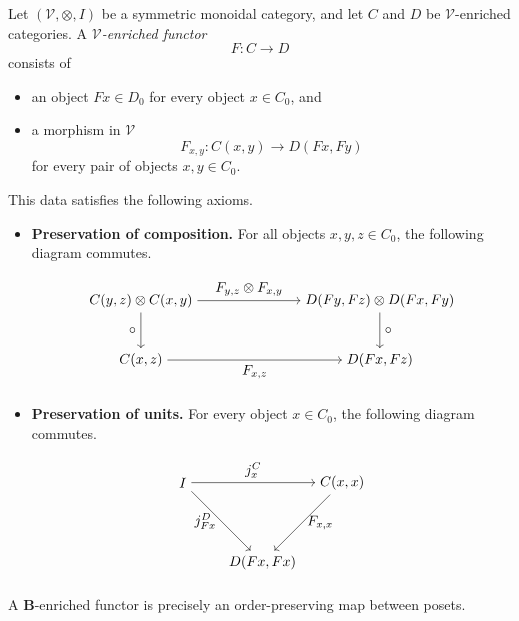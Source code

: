 \documentclass{tac}
\begin{document}
\begin{definition}
Let $(\mathcal{V},\otimes,I)$ be a symmetric monoidal category, and let $C$
and $D$ be $\mathcal{V}$-enriched categories. A
\emph{$\mathcal{V}$-enriched functor}
\[
F:C\to D
\]
consists of

\begin{itemize}
    \item an object $Fx\in D_0$ for every object $x\in C_0$, and
    \item a morphism in $\mathcal{V}$
    \[
    F_{x,y}:C(x,y)\to D(Fx,Fy)
    \]
    for every pair of objects $x,y\in C_0$.
\end{itemize}

This data satisfies the following axioms.
\begin{itemize}
    \item \textbf{Preservation of composition.}
    For all objects $x,y,z\in C_0$, the following diagram commutes.
    
    \[
    \begin{tikzpicture}[node distance=4cm]
        \node (A) at (0,0)
        {$C(y,z)\otimes C(x,y)$};

        \node (B) at (6,0)
        {$D(Fy,Fz)\otimes D(Fx,Fy)$};

        \node (C) at (0,-1.5)
        {$C(x,z)$};

        \node (D) at (6,-1.5)
        {$D(Fx,Fz)$};

        \draw[->] (A)--node[above]{$F_{y,z}\otimes F_{x,y}$}(B);
        \draw[->] (A)--node[left]{$\circ$}(C);
        \draw[->] (B)--node[right]{$\circ$}(D);
        \draw[->] (C)--node[below]{$F_{x,z}$}(D);
    \end{tikzpicture}
    \]

    \item \textbf{Preservation of units.}
    For every object $x\in C_0$, the following diagram commutes.
    
    \[
    \begin{tikzpicture}
        \node (A) at (0,0) {$I$};
        \node (B) at (4,0) {$C(x,x)$};
        \node (C) at (2,-2) {$D(Fx,Fx)$};

        \draw[->](A)--node[above]{$j_x^C$}(B);
        \draw[->](A)--node[left]{$j_{Fx}^D$}(C);
        \draw[->](B)--node[right]{$F_{x,x}$}(C);
    \end{tikzpicture}
    \]
\end{itemize}
\end{definition}

\begin{example}
A $\mathbf{B}$-enriched functor is precisely an order-preserving map between
posets.
\end{example}
\end{document}
